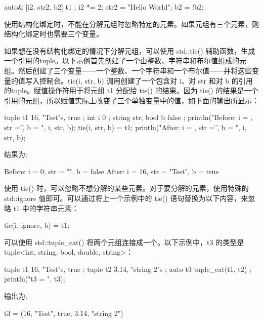 \begin{cpp}
auto& [i2, str2, b2] { t1 };
i2 *= 2;
str2 = "Hello World";
b2 = !b2;
\end{cpp}

使用结构化绑定时，不能在分解元组时忽略特定的元素。如果元组有三个元素，则结构化绑定时也需要三个变量。


如果想在没有结构化绑定的情况下分解元组，可以使用 std::tie() 辅助函数，生成一个引用的tuple。以下示例首先创建了一个由整数、字符串和布尔值组成的元组。然后创建了三个变量——一个整数、一个字符串和一个布尔值——并将这些变量的值写入控制台。tie(i, str, b) 调用创建了一个包含对 i、对 str 和对 b 的引用的tuple。赋值操作符用于将元组 t1 分配给 tie() 的结果。因为 tie() 的结果是一个引用的元组，所以赋值实际上改变了三个单独变量中的值，如下面的输出所显示：

\begin{cpp}
tuple t1 { 16, "Test"s, true };
int i { 0 };
string str;
bool b { false };
println("Before: i = {}, str = \"{}\", b = {}", i, str, b);
tie(i, str, b) = t1;
println("After: i = {}, str = \"{}\", b = {}", i, str, b);
\end{cpp}

结果为:

\begin{shell}
Before: i = 0, str = "", b = false
After: i = 16, str = "Test", b = true
\end{shell}

使用 tie() 时，可以忽略不想分解的某些元素。对于要分解的元素，使用特殊的 std::ignore 值即可。可以通过将上一个示例中的 tie() 语句替换为以下内容，来忽略 t1 中的字符串元素：

\begin{cpp}
tie(i, ignore, b) = t1;
\end{cpp}


可以使用 std::tuple\_cat() 将两个元组连接成一个。以下示例中，t3 的类型是 tuple<int, string, bool, double, string>：

\begin{cpp}
tuple t1 { 16, "Test"s, true };
tuple t2 { 3.14, "string 2"s };
auto t3 { tuple_cat(t1, t2) };
println("t3 = {}", t3);
\end{cpp}

输出为:

\begin{shell}
t3 = (16, "Test", true, 3.14, "string 2")
\end{shell}


